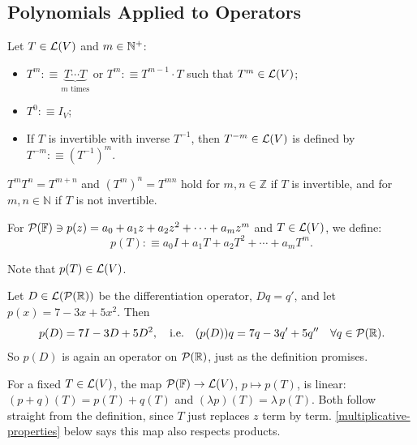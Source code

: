 \subsection{Polynomials Applied to Operators}

\setcounter{thm}{12}
\begin{mydef} [notation $T^m$]
  Let $T \in \mathcal{L}(V)$ and $m\in \mathbb{N}^{+}$:
  \begin{itemize}
    \item $T^{m} :\equiv \underbrace{T \cdots T}_{\text{$m$ times}}$ or $T^{m} :\equiv T^{m-1} \cdot T$ such that $T^{m} \in \mathcal{L}(V)$;
    \item $T^0 :\equiv I_V$;
    \item If $T$ is invertible with inverse $T^{-1}$, then $T^{-m}\in \mathcal{L}(V)$ is defined by $T^{-m} :\equiv (T^{-1})^m$.
  \end{itemize}
\end{mydef}
$T^m T^n = T^{m+n}$ and $(T^m)^n=T^{mn}$ hold for $m,n \in \mathbb{Z}$ if $T$ is invertible, and for $m,n \in \mathbb{N}$ if $T$ is not invertible.

\begin{mydef} [notation $p(T)$]
  For $\mathcal{P} (\mathbb{F}) \ni p(z) = a_0+a_1z+a_2z^2+\cdots+a_mz^m$
 and
  $T \in \mathcal{L} (V)$, we define:
  \begin{equation}
    p(T) :\equiv a_0 I + a_1 T + a_2 T^2 + \cdots + a_m T^m.
  \end{equation}

  Note that $p(T) \in \mathcal{L}(V)$.
\end{mydef}

\begin{example}
  Let $D \in \mathcal{L}(\mathcal{P}(\mathbb{R}))$ be the differentiation operator, $Dq = q'$, and let $p(x) = 7 - 3x + 5x^2$. Then
  \begin{equation}
    p(D) = 7I - 3D + 5D^2, \quad \text{i.e.} \quad (p(D))q = 7q - 3q' + 5q'' \quad \forall q \in \mathcal{P}(\mathbb{R}).
  \end{equation}
  So $p(D)$ is again an operator on $\mathcal{P}(\mathbb{R})$, just as the definition promises.
\end{example}

\begin{ainote}
  For a fixed $T \in \mathcal{L}(V)$, the map $\mathcal{P}(\mathbb{F}) \to \mathcal{L}(V)$, $p \mapsto p(T)$, is linear: $(p+q)(T) = p(T) + q(T)$ and $(\lambda p)(T) = \lambda\, p(T)$. Both follow straight from the definition, since $T$ just replaces $z$ term by term. \autoref{multiplicative-properties} below says this map also respects products.
\end{ainote}

